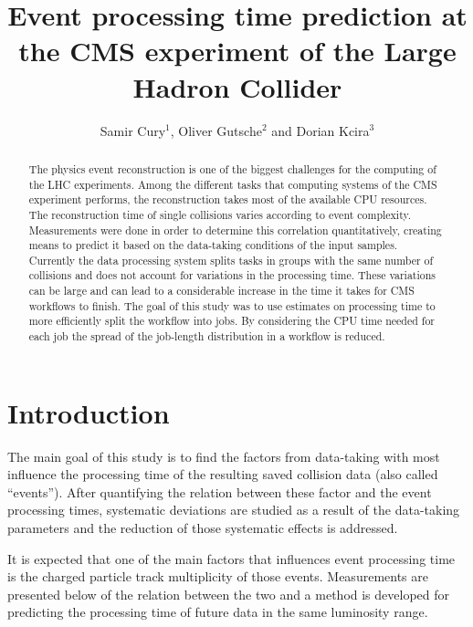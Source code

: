 \documentclass[a4paper]{jpconf}
\begin{document}
\title{Event processing time prediction at the CMS experiment of the Large Hadron Collider}

\author{Samir Cury$^1$, Oliver Gutsche$^2$ and Dorian Kcira$^3$}

\address{$^{1,3}$ California Institute of Technology}
\address{$^2$ Fermi National Accelerator Laboratory}


\begin{abstract}
  The physics event reconstruction is one of the biggest challenges for the computing of the LHC experiments.
  Among the different tasks that computing systems of the CMS experiment performs, the reconstruction takes most of the available CPU resources. The reconstruction time of single collisions varies according to event complexity. Measurements were done in order to determine this correlation quantitatively, creating means to predict it based on the data-taking conditions of the input samples.
  Currently the data processing system splits tasks in groups with the same number of collisions and does not account for variations in the processing time. These variations can be large and can lead to a considerable increase in the time it takes for CMS workflows to finish.
%
The goal of this study was to use estimates on processing time to more efficiently split the workflow into jobs. By considering the CPU time needed for each job the spread of the job-length distribution in a workflow is reduced.
\end{abstract}

\section{Introduction}

The main goal of this study is to find the factors from data-taking with most influence the processing time of the resulting saved collision data (also called ``events''). After quantifying the relation between these factor and the event processing times, systematic deviations are studied as a result of the data-taking parameters and the reduction of those systematic effects is addressed.

It is expected that one of the main factors that influences event processing time is the charged particle track multiplicity of those events. Measurements are presented below of the relation between the two and a method is developed for predicting the processing time of future data in the same luminosity range.
\end{document}
